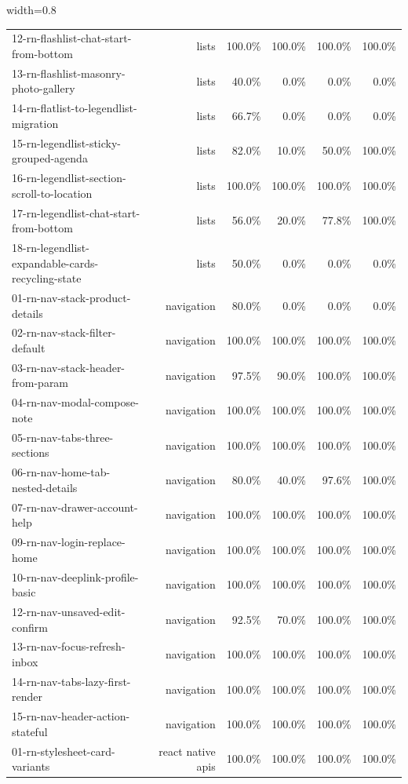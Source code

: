\begin{table}[htbp]
\begin{adjustbox}{width=0.8\textwidth}
\begin{tabular}{lrrrrr}
12-rn-flashlist-chat-start-from-bottom & lists & 100.0\% & 100.0\% & 100.0\% & 100.0\% \\
13-rn-flashlist-masonry-photo-gallery & lists & 40.0\% & 0.0\% & 0.0\% & 0.0\% \\
14-rn-flatlist-to-legendlist-migration & lists & 66.7\% & 0.0\% & 0.0\% & 0.0\% \\
15-rn-legendlist-sticky-grouped-agenda & lists & 82.0\% & 10.0\% & 50.0\% & 100.0\% \\
16-rn-legendlist-section-scroll-to-location & lists & 100.0\% & 100.0\% & 100.0\% & 100.0\% \\
17-rn-legendlist-chat-start-from-bottom & lists & 56.0\% & 20.0\% & 77.8\% & 100.0\% \\
18-rn-legendlist-expandable-cards-recycling-state & lists & 50.0\% & 0.0\% & 0.0\% & 0.0\% \\
01-rn-nav-stack-product-details & navigation & 80.0\% & 0.0\% & 0.0\% & 0.0\% \\
02-rn-nav-stack-filter-default & navigation & 100.0\% & 100.0\% & 100.0\% & 100.0\% \\
03-rn-nav-stack-header-from-param & navigation & 97.5\% & 90.0\% & 100.0\% & 100.0\% \\
04-rn-nav-modal-compose-note & navigation & 100.0\% & 100.0\% & 100.0\% & 100.0\% \\
05-rn-nav-tabs-three-sections & navigation & 100.0\% & 100.0\% & 100.0\% & 100.0\% \\
06-rn-nav-home-tab-nested-details & navigation & 80.0\% & 40.0\% & 97.6\% & 100.0\% \\
07-rn-nav-drawer-account-help & navigation & 100.0\% & 100.0\% & 100.0\% & 100.0\% \\
09-rn-nav-login-replace-home & navigation & 100.0\% & 100.0\% & 100.0\% & 100.0\% \\
10-rn-nav-deeplink-profile-basic & navigation & 100.0\% & 100.0\% & 100.0\% & 100.0\% \\
12-rn-nav-unsaved-edit-confirm & navigation & 92.5\% & 70.0\% & 100.0\% & 100.0\% \\
13-rn-nav-focus-refresh-inbox & navigation & 100.0\% & 100.0\% & 100.0\% & 100.0\% \\
14-rn-nav-tabs-lazy-first-render & navigation & 100.0\% & 100.0\% & 100.0\% & 100.0\% \\
15-rn-nav-header-action-stateful & navigation & 100.0\% & 100.0\% & 100.0\% & 100.0\% \\
01-rn-stylesheet-card-variants & react native apis & 100.0\% & 100.0\% & 100.0\% & 100.0\% \\

\end{tabular}
\end{adjustbox}
\end{table}
